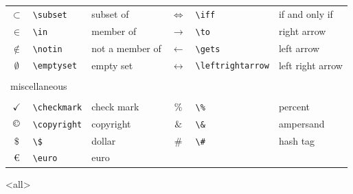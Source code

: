 \begin{table}[ht!]
\begin{tabular}{cll|cll}
        $\subset$	    &	\verb|\subset|	    &	subset of	        &	$\iff$	            &	\verb|\iff|	            &	if and only if	    \\
        $\in$	        &	\verb|\in|	        &	member of	        &	$\to$	            &	\verb|\to|	            &	right arrow	        \\
        $\notin$	    &	\verb|\notin|	    &	not a member of	    &	$\gets$	            &	\verb|\gets|	        &	left arrow	        \\
        $\emptyset$	&	\verb|\emptyset|	    &	empty set	        &	$\leftrightarrow$	&	\verb|\leftrightarrow|	&	left right arrow	\\
        \\\multicolumn{2}{l}{miscellaneous}		&		                &		                &		                    &		                \\\\
        $\checkmark$	&	\verb|\checkmark|	&	check mark	        &	$\%$	            &	\verb|\%|	            &	percent	            \\
        $\copyright$	&	\verb|\copyright|	&	copyright	        &	$\&$	            &	\verb|\&|	            &	ampersand	        \\
        $\$$	        &	\verb|\$|	&	dollar              &	$\#$	            &	\verb|\#|	            &	hash tag            \\
        \euro	        &	\verb|\euro|	&	euro              &		            &	            &            \\
        \bottomrule
    \end{tabular}
\end{table}

\mode<all>